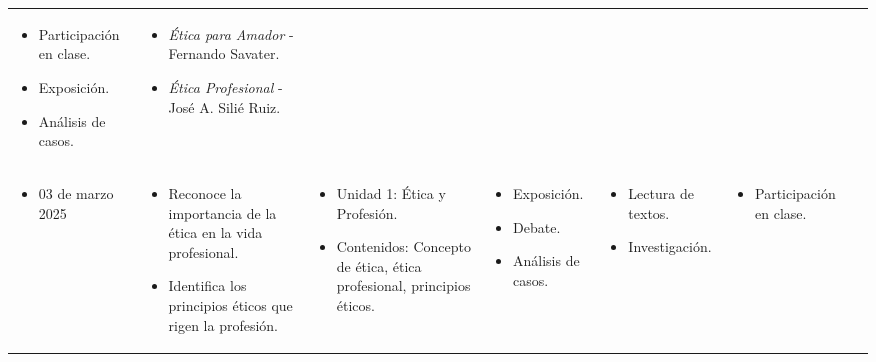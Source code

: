 \begin{landscape}
\begin{xltabular}{\linewidth}{@{}X@{}X@{}X@{}X@{}X@{}X@{}X@{}}
        \begin{itemize}
            \item Participación en clase.
            \item Exposición.
            \item Análisis de casos.
        \end{itemize}                             &
        \begin{itemize}
            \item \textit{Ética para Amador} - Fernando Savater.
            \item \textit{Ética Profesional} - José A. Silié Ruiz.
        \end{itemize}\\
        \begin{itemize}[label={}, left=0pt .. 0pt]
            \item 03 de marzo 2025
        \end{itemize}                                                          &
        \begin{itemize}
            \item Reconoce la importancia de la ética en la vida profesional.
            \item Identifica los principios éticos que rigen la profesión.
        \end{itemize}          &
        \begin{itemize}
            \item Unidad 1: Ética y Profesión.
            \item Contenidos: Concepto de ética, ética profesional, principios éticos.
        \end{itemize} &
        \begin{itemize}
            \item Exposición.
            \item Debate.
            \item Análisis de casos.
        \end{itemize}                             &
        \begin{itemize}
            \item Lectura de textos.
            \item Investigación.
        \end{itemize}                             &
        \begin{itemize}
            \item Participación en clase.

\end{itemize}
\end{xltabular}
\end{landscape}
